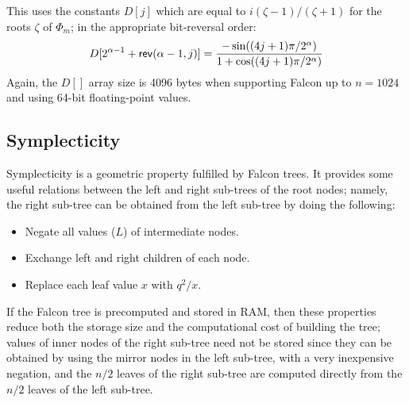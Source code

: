 \documentclass{llncs}
\newcommand{\bR}{\mathbb{R}}
\newcommand{\adj}[1]{{#1}^*}
\begin{document}
\begin{algorithm}
    \caption{\ \ \textsf{mul-iXadj}\label{alg:mul-iXadj}}
    \begin{algorithmic}[1]
        \Require{$a \in \bR[X]/\Phi_m$ (FFT), $\lambda \in \bR[X]/\Phi_m$
            such that $\adj{\lambda} = \lambda$ (FFT, half-size)}
        \EndFor
    \end{algorithmic}
\end{algorithm}

This uses the constants $D[j]$ which are equal to
$i(\zeta - 1)/(\zeta + 1)$ for the roots $\zeta$ of $\Phi_m$; in
the appropriate bit-reversal order:
\begin{eqnarray*}
    D[2^{\alpha - 1} + \text{\textsf{rev}}(\alpha - 1, j)]
        = \frac{-\sin((4j + 1)\pi/2^\alpha)}{1 + \cos((4j + 1)\pi/2^\alpha)}
\end{eqnarray*}
Again, the $D[]$ array size is 4096 bytes when supporting Falcon up to
$n = 1024$ and using 64-bit floating-point values.

\subsection{Symplecticity}

Symplecticity is a geometric property fulfilled by Falcon
trees\cite{SunZhoZhaTaoQiaMin2022}. It provides some useful relations
between the left and right sub-trees of the root nodes; namely, the
right sub-tree can be obtained from the left sub-tree by doing the
following:
\begin{itemize}
    \item Negate all values ($L$) of intermediate nodes.

    \item Exchange left and right children of each node.

    \item Replace each leaf value $x$ with $q^2/x$.
\end{itemize}
If the Falcon tree is precomputed and stored in RAM, then these properties
reduce both the storage size and the computational cost of building the
tree; values of inner nodes of the right sub-tree need not be stored since
they can be obtained by using the mirror nodes in the left sub-tree, with
a very inexpensive negation, and the $n/2$ leaves of the right sub-tree
are computed directly from the $n/2$ leaves of the left sub-tree.
\end{document}
